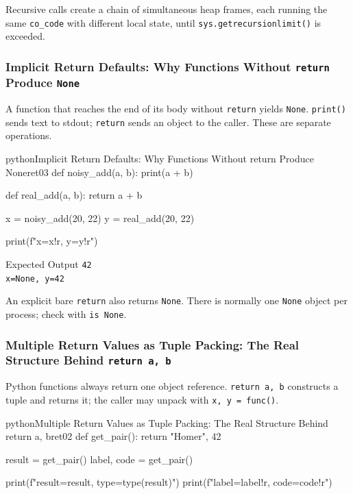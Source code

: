 Recursive calls create a chain of simultaneous heap frames, each running the same \texttt{co\_code} with different local state, until \texttt{sys.getrecursionlimit()} is exceeded.

\subsubsection{Implicit Return Defaults: Why Functions Without \texttt{return} Produce \texttt{None}}

A function that reaches the end of its body without \texttt{return} yields \texttt{None}. \texttt{print()} sends text to stdout; \texttt{return} sends an object to the caller. These are separate operations.

\begin{codebox}[]{python}{Implicit Return Defaults: Why Functions Without return Produce None}{ret03}
def noisy_add(a, b):
    print(a + b)

def real_add(a, b):
    return a + b

x = noisy_add(20, 22)
y = real_add(20, 22)

print(f"x={x!r}, y={y!r}")
\end{codebox}


\begin{iobox}{Expected Output}
\texttt{42} \\
\texttt{x=None, y=42} \\
\end{iobox}




An explicit bare \texttt{return} also returns \texttt{None}. There is normally one \texttt{None} object per process; check with \texttt{is None}.

\subsubsection{Multiple Return Values as Tuple Packing: The Real Structure Behind \texttt{return a, b}}

Python functions always return one object reference. \texttt{return a, b} constructs a tuple and returns it; the caller may unpack with \texttt{x, y = func()}.

\begin{codebox}[]{python}{Multiple Return Values as Tuple Packing: The Real Structure Behind return a, b}{ret02}
def get_pair():
    return "Homer", 42

result = get_pair()
label, code = get_pair()

print(f"result={result}, type={type(result)}")
print(f"label={label!r}, code={code!r}")
\end{codebox}


